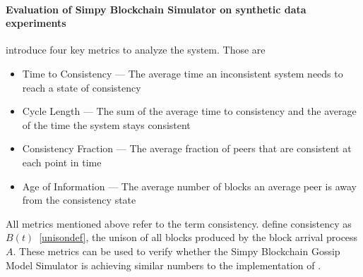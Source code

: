\paragraph{Evaluation of Simpy Blockchain Simulator on synthetic data experiments}
\citeauthor{gopalan} introduce four key metrics to analyze the system. Those are 
\begin{itemize}
\item Time to Consistency --- The average time an inconsistent system needs to reach a state of consistency
\item Cycle Length --- The sum of the average time to consistency and the average of the time the system stays consistent
\item Consistency Fraction --- The average fraction of peers that are consistent at each point in time
\item Age of Information --- The average number of blocks an average peer is away from the consistency state
\end{itemize}
All metrics mentioned above refer to the term consistency. \gopalan define consistency as $B(t)$~\ref{unisondef}, the unison of all blocks produced by the block arrival process $A$.
These metrics can be used to verify whether the Simpy Blockchain Gossip Model Simulator is achieving similar numbers to the implementation of \gopalan . 
